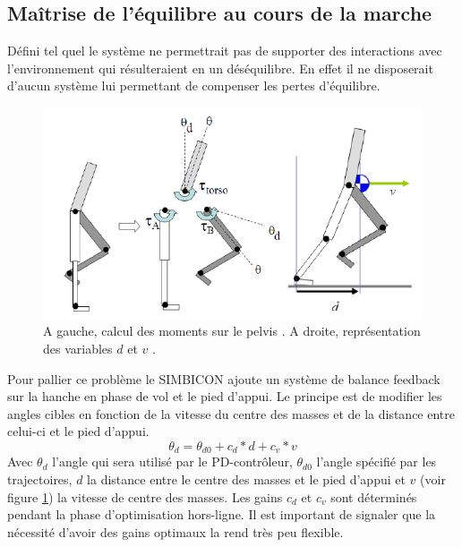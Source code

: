 \documentclass{llncs}
\begin{document}
\subsection{Maîtrise de l'équilibre au cours de la marche}

Défini tel quel le système ne permettrait pas de supporter des interactions avec l'environnement qui résulteraient en un déséquilibre. En effet il ne disposerait d'aucun système lui permettant de compenser les pertes d'équilibre.

\begin{figure}[h]
\centering
\includegraphics[scale=0.5]{stance_torque_and_v_and_d.png}
\caption{A gauche, calcul des moments sur le pelvis \cite{yin2007simbicon}. A droite, représentation des variables \(d\) et \(v\) \cite{yin2007simbicon}.}
\label{fig:torques_pelvis}
\label{fig:d_and_v}
\end{figure}

Pour pallier ce problème le SIMBICON ajoute un système de balance feedback sur la hanche en phase de vol et le pied d'appui. Le principe est de modifier les angles cibles en fonction de la vitesse du centre des masses et de la distance entre celui-ci et le pied d'appui. 
\[
\theta_d=\theta_{d0} + c_d*d + c_v*v 
\]
Avec \(\theta_d\) l'angle qui sera utilisé par le PD-contrôleur, \(\theta_{d0}\) l'angle spécifié par les trajectoires, \(d\) la distance entre le centre des masses et le pied d'appui et \(v\) (voir figure \ref{fig:d_and_v}) la vitesse de centre des masses.
Les gains \(c_d\) et \(c_v\) sont déterminés pendant la phase d'optimisation hors-ligne. Il est important de signaler que la nécessité d'avoir des gains optimaux la rend très peu flexible.
\end{document}
